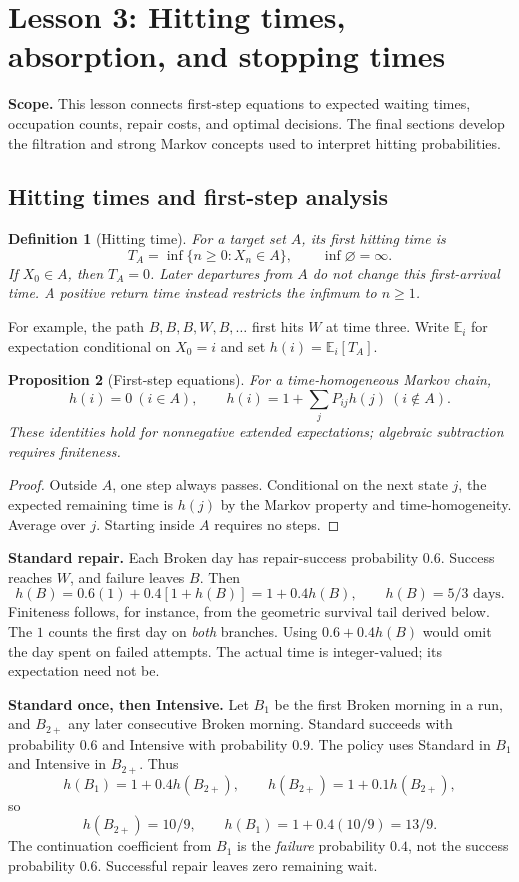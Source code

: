 \documentclass[11pt]{article}
\newtheorem{definition}{Definition}[section]
\newtheorem{proposition}[definition]{Proposition}
\theoremstyle{remark}\newtheorem{remark}[definition]{Remark}
\newcommand{\E}{\mathbb E}\newcommand{\Prob}{\mathbb P}
\begin{document}
\clearpage
{}
\section{Lesson 3: Hitting times, absorption, and stopping times}
\textbf{Scope.} This lesson connects first-step equations to expected waiting times, occupation counts, repair costs, and optimal decisions. The final sections develop the filtration and strong Markov concepts used to interpret hitting probabilities.

\subsection{Hitting times and first-step analysis}
\begin{definition}[Hitting time]
For a target set $A$, its first hitting time is
\[
T_A=\inf\{n\geq0:X_n\in A\},\qquad \inf\varnothing=\infty.
\]
If $X_0\in A$, then $T_A=0$. Later departures from $A$ do not change this first-arrival time. A positive return time instead restricts the infimum to $n\geq1$.
\end{definition}
For example, the path $B,B,B,W,B,\ldots$ first hits $W$ at time three. Write $\E_i$ for expectation conditional on $X_0=i$ and set $h(i)=\E_i[T_A]$.
\begin{proposition}[First-step equations]
For a time-homogeneous Markov chain,
\[
h(i)=0\ (i\in A),\qquad h(i)=1+\sum_jP_{ij}h(j)\ (i\notin A).
\]
These identities hold for nonnegative extended expectations; algebraic subtraction requires finiteness.
\end{proposition}
\begin{proof}
Outside $A$, one step always passes. Conditional on the next state $j$, the expected remaining time is $h(j)$ by the Markov property and time-homogeneity. Average over $j$. Starting inside $A$ requires no steps.
\end{proof}

\textbf{Standard repair.} Each Broken day has repair-success probability $0.6$. Success reaches $W$, and failure leaves $B$. Then
\[
h(B)=0.6(1)+0.4[1+h(B)]=1+0.4h(B),
\qquad \boxed{h(B)=5/3\text{ days}.}
\]
Finiteness follows, for instance, from the geometric survival tail derived below. The $1$ counts the first day on \emph{both} branches. Using $0.6+0.4h(B)$ would omit the day spent on failed attempts. The actual time is integer-valued; its expectation need not be.

\textbf{Standard once, then Intensive.} Let $B_1$ be the first Broken morning in a run, and $B_{2+}$ any later consecutive Broken morning. Standard succeeds with probability $0.6$ and Intensive with probability $0.9$. The policy uses Standard in $B_1$ and Intensive in $B_{2+}$. Thus
\[
h(B_1)=1+0.4h(B_{2+}),\qquad
h(B_{2+})=1+0.1h(B_{2+}),
\]
so
\[
\boxed{h(B_{2+})=10/9,\qquad h(B_1)=1+0.4(10/9)=13/9.}
\]
The continuation coefficient from $B_1$ is the \emph{failure} probability $0.4$, not the success probability $0.6$. Successful repair leaves zero remaining wait.
\end{document}

